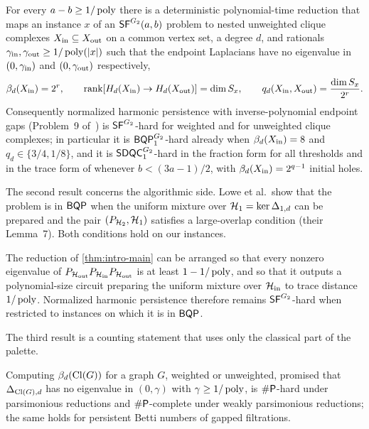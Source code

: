 \begin{theorem}
\label{thm:intro-main}
For every \(a-b\ge1/\operatorname{poly}\) there is a deterministic polynomial-time reduction that maps an instance \(x\) of an \(\mathsf{SF}^{G_2}(a,b)\) problem to nested unweighted clique complexes \(X_{\mathrm{in}}\subseteq X_{\mathrm{out}}\) on a common vertex set, a degree \(d\), and rationals \(\gamma_{\rm in},\gamma_{\rm out}\ge1/\operatorname{poly}(|x|)\) such that the endpoint Laplacians have no eigenvalue in \((0,\gamma_{\rm in})\) and \((0,\gamma_{\rm out})\) respectively,
\[
\beta_d(X_{\mathrm{in}})=2^{r},\qquad
\operatorname{rank}[H_d(X_{\mathrm{in}})\to H_d(X_{\mathrm{out}})]=\dim S_x,\qquad
q_d(X_{\mathrm{in}},X_{\mathrm{out}})=\frac{\dim S_x}{2^{r}} .
\]
Consequently normalized harmonic persistence with inverse-polynomial endpoint gaps (Problem~9 of~\cite{lowe2026normalized}) is \(\mathsf{SF}^{G_2}\)-hard for weighted and for unweighted clique complexes; in particular it is \(\mathsf{BQP}_{1}^{G_2}\)-hard already when \(\beta_d(X_{\mathrm{in}})=8\) and \(q_d\in\{3/4,1/8\}\), and it is \(\mathsf{SDQC}_{1}^{G_2}\)-hard in the fraction form for all thresholds and in the trace form of \cite[Definition~2]{lowe2026normalized} whenever \(b<(3a-1)/2\), with \(\beta_d(X_{\mathrm{in}})=2^{q-1}\) initial holes.
\end{theorem}

The second result concerns the algorithmic side. Lowe et al.\ show that the problem is in \(\mathsf{BQP}\) when the uniform mixture over \(\mathcal{H}_1=\ker\Delta_{1,d}\) can be prepared and the pair \((P_{\mathcal{H}_2},\mathcal{H}_1)\) satisfies a large-overlap condition (their Lemma~7). Both conditions hold on our instances.

\begin{theorem}
\label{thm:intro-advantage}
The reduction of \cref{thm:intro-main} can be arranged so that every nonzero eigenvalue of \(P_{\mathcal{H}_{\rm out}}P_{\mathcal{H}_{\rm in}}P_{\mathcal{H}_{\rm out}}\) is at least \(1-1/\operatorname{poly}\), and so that it outputs a polynomial-size circuit preparing the uniform mixture over \(\mathcal{H}_{\rm in}\) to trace distance \(1/\operatorname{poly}\). Normalized harmonic persistence therefore remains \(\mathsf{SF}^{G_2}\)-hard when restricted to instances on which it is in \(\mathsf{BQP}\).
\end{theorem}

The third result is a counting statement that uses only the classical part of the palette.

\begin{theorem}
\label{thm:intro-betti}
Computing \(\beta_d(\operatorname{Cl}(G))\) for a graph \(G\), weighted or unweighted, promised that \(\Delta_{\operatorname{Cl}(G),d}\) has no eigenvalue in \((0,\gamma)\) with \(\gamma\ge1/\operatorname{poly}\), is \(\#\mathsf{P}\)-hard under parsimonious reductions and \(\#\mathsf{P}\)-complete under weakly parsimonious reductions; the same holds for persistent Betti numbers of gapped filtrations.
\end{theorem}

